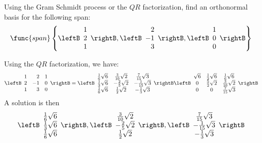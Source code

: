 \begin{enumialphparenastyle}

\begin{ex} Using the Gram Schmidt process or the $QR$ factorization, find an
orthonormal basis for the following span:
\[
\func{span} \left\{\leftB
\begin{array}{r}
1 \\
2 \\
1
\end{array}
\rightB ,\leftB
\begin{array}{r}
2 \\
-1 \\
3
\end{array}
\rightB , \leftB
\begin{array}{r}
1 \\
0 \\
0
\end{array}
\rightB \right\}
\]
\begin{sol}
Using the $QR$ factorization, we have:
\[
\leftB
\begin{array}{rrr}
1 & 2 & 1 \\
2 & -1 & 0 \\
1 & 3 & 0
\end{array}
\rightB = \leftB
\begin{array}{ccc}
\frac{1}{6}\sqrt{6} & \frac{3}{10}\sqrt{2} & \frac{7}{15}\sqrt{3} \\
\frac{1}{3}\sqrt{6} & -\frac{2}{5}\sqrt{2} & -\frac{1}{15}\sqrt{3} \\
\frac{1}{6}\sqrt{6} & \frac{1}{2}\sqrt{2} & -\frac{1}{3}\sqrt{3}
\end{array}
\rightB  \leftB
\begin{array}{ccc}
\sqrt{6} & \frac{1}{2}\sqrt{6} & \frac{1}{6}\sqrt{6} \\
0 & \frac{5}{2}\sqrt{2} & \frac{3}{10}\sqrt{2} \\
0 & 0 & \frac{7}{15}\sqrt{3}
\end{array}
\rightB
\]
A solution is then
\[
\leftB
\begin{array}{c}
\frac{1}{6}\sqrt{6} \\
\frac{1}{3}\sqrt{6} \\
\frac{1}{6}\sqrt{6}
\end{array}
\rightB ,\leftB
\begin{array}{c}
\frac{3}{10}\sqrt{2} \\
-\frac{2}{5}\sqrt{2} \\
\frac{1}{2}\sqrt{2}
\end{array}
\rightB ,\leftB
\begin{array}{c}
\frac{7}{15}\sqrt{3} \\
-\frac{1}{15}\sqrt{3} \\
-\frac{1}{3}\sqrt{3}
\end{array}
\rightB
\]
\end{sol}
\end{ex}


\end{enumialphparenastyle}
